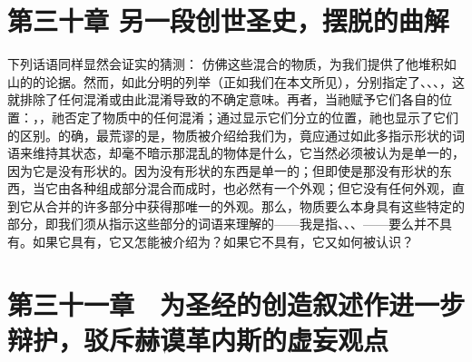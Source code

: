 \section{第三十章 另一段创世圣史，摆脱的曲解}

下列话语同样显然会证实的猜测：  仿佛这些混合的物质，为我们提供了他堆积如山的的论据。然而，如此分明的列举（正如我们在本文所见），分别指定了、、、，这就排除了任何混淆或由此混淆导致的不确定意味。再者，当祂赋予它们各自的位置：，，祂否定了物质中的任何混淆；通过显示它们分立的位置，祂也显示了它们的区别。的确，最荒谬的是，物质被介绍给我们为，竟应通过如此多指示形状的词语来维持其状态，却毫不暗示那混乱的物体是什么，它当然必须被认为是单一的，因为它是没有形状的。因为没有形状的东西是单一的；但即使是那没有形状的东西，当它由各种组成部分混合而成时，也必然有一个外观；但它没有任何外观，直到它从合并的许多部分中获得那唯一的外观。那么，物质要么本身具有这些特定的部分，即我们须从指示这些部分的词语来理解的——我是指、、、——要么并不具有。如果它具有，它又怎能被介绍为？如果它不具有，它又如何被认识？\par


\section{第三十一章　为圣经的创造叙述作进一步辩护，驳斥赫谟革内斯的虚妄观点}

